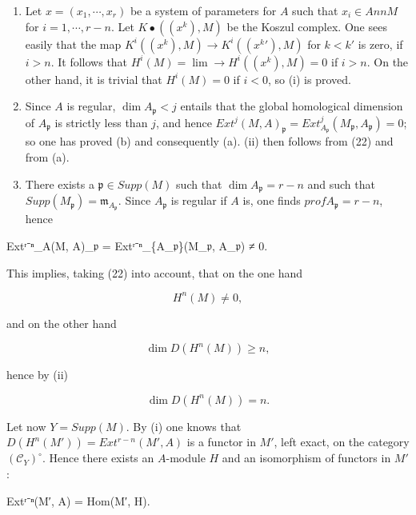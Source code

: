 \documentclass[
  11pt,
  a4paper,
]{book}
\newenvironment{Shaded}{}{}
\newcommand{\NormalTok}[1]{#1}
\begin{document}
\begin{enumerate}
\def\labelenumi{(\roman{enumi})}
\item
  Let \(x = (x_{1}, \cdots, x_{r})\) be a system of parameters for \(A\)
  such that \(x_{i} \in Ann M\) for \(i = 1, \cdots, r - n\). Let
  \(K\bullet((x^{k}), M)\) be the Koszul complex. One sees easily that
  the map \(K^{i}((x^{k}), M) \to K^{i}(({x^{k}}'), M)\) for \(k < k'\)
  is zero, if \(i > n\). It follows that
  \(H^{i}(M) = \lim\to H^{i}((x^{k}), M) = 0\) if \(i > n\). On the
  other hand, it is trivial that \(H^{i}(M) = 0\) if \(i < 0\), so (i)
  is proved.
\item
  Since \(A\) is regular, \(\dim A_{\mathfrak{p}} < j\) entails that the
  global homological dimension of \(A_{\mathfrak{p}}\) is strictly less
  than \(j\), and hence \(Ext^{j}(M, A)_{\mathfrak{p}} =
  Ext^{j}_{A_{\mathfrak{p}}}(M_{\mathfrak{p}}, A_{\mathfrak{p}}) = 0\);
  so one has proved (b) and consequently (a). (ii) then follows from
  (22) and from (a).
\item
  There exists a \(\mathfrak{p} \in Supp(M)\) such that
  \(\dim A_{\mathfrak{p}} = r - n\) and such that
  \(Supp(M_{\mathfrak{p}}) = {\mathfrak{m}_{A_{\mathfrak{p}}}}\). Since
  \(A_{\mathfrak{p}}\) is regular if \(A\) is, one finds
  \(prof A_{\mathfrak{p}} = r - n\), hence
\end{enumerate}

\begin{Shaded}
\begin{Highlighting}[]
\NormalTok{Extʳ⁻ⁿ\_A(M, A)\_𝔭 = Extʳ⁻ⁿ\_\{A\_𝔭\}(M\_𝔭, A\_𝔭) ≠ 0.}
\end{Highlighting}
\end{Shaded}

This implies, taking (22) into account, that on the one hand

\[ H^{n}(M) \neq 0, \]

and on the other hand

\[ \dim D(H^{n}(M)) \geqslant n, \]

hence by (ii)

\[ \dim D(H^{n}(M)) = n. \]

Let now \(Y = Supp(M)\). By (i) one knows that
\(D(H^{n}(M')) = Ext^{r-n}(M', A)\) is a functor in \(M'\), left exact,
on the category \((\mathcal{C}_{Y})^{\circ}\). Hence there exists an
\(A\)-module \(H\) and an isomorphism of functors in \(M'\):

\begin{Shaded}
\begin{Highlighting}[]
\NormalTok{Extʳ⁻ⁿ(M′, A) = Hom(M′, H).}
\end{Highlighting}
\end{Shaded}
\end{document}
